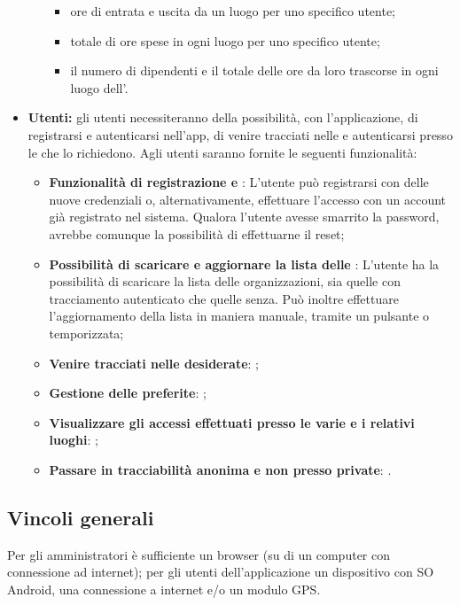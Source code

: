 \begin{itemize}
\begin{itemize}
            \begin{itemize}
                \item ore di entrata e uscita da un luogo per uno specifico utente;
                \item totale di ore spese in ogni luogo per uno specifico utente;
                \item il numero di dipendenti e il totale delle ore da loro trascorse in ogni luogo dell'.
            \end{itemize}
        \end{itemize}
    \item \textbf{Utenti:} gli utenti necessiteranno della possibilità, con l'applicazione, di registrarsi e autenticarsi nell'app, di venire tracciati nelle  e autenticarsi presso le  che lo richiedono. Agli utenti saranno fornite le seguenti funzionalità:
    \begin{itemize}
        \item \textbf{Funzionalità di registrazione e }: L'utente può registrarsi con delle nuove credenziali o, alternativamente, effettuare l'accesso con un account già registrato nel sistema. Qualora l'utente avesse smarrito la password, avrebbe comunque la possibilità di effettuarne il reset;
        \item \textbf{Possibilità di scaricare e aggiornare la lista delle }: L'utente ha la possibilità di scaricare la lista delle organizzazioni, sia quelle con tracciamento autenticato che quelle senza. Può inoltre effettuare l'aggiornamento della lista in maniera manuale, tramite un pulsante o temporizzata;
        \item \textbf{Venire tracciati nelle  desiderate}: ;
        \item \textbf{Gestione delle  preferite}: ;
        \item \textbf{Visualizzare gli accessi effettuati presso le varie  e i relativi luoghi}: ;
        \item \textbf{Passare in tracciabilità anonima e non presso  private}: .
    \end{itemize}
\end{itemize}
\subsection{Vincoli generali}
Per gli amministratori è sufficiente un browser (su di un computer con connessione ad internet); per gli utenti dell'applicazione un dispositivo con SO Android, una connessione a internet e/o un modulo GPS.